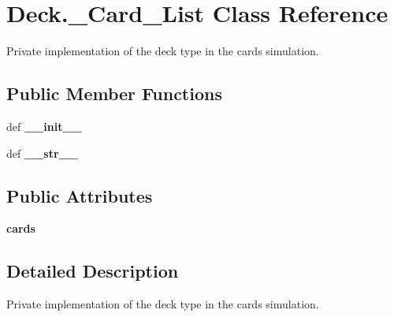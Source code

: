 \hypertarget{classDeck_1_1__Card__List}{\section{Deck.\-\_\-\-Card\-\_\-\-List Class Reference}
\label{classDeck_1_1__Card__List}
}


Private implementation of the deck type in the cards simulation.  


\subsection*{Public Member Functions}
\begin{DoxyCompactItemize}
\item 
\hypertarget{classDeck_1_1__Card__List_ae6fadbe948a40577d0ced48281f3df08}{def {\bfseries \-\_\-\-\_\-init\-\_\-\-\_\-}}\label{classDeck_1_1__Card__List_ae6fadbe948a40577d0ced48281f3df08}

\item 
\hypertarget{classDeck_1_1__Card__List_a949bf52f013fbe75fd2830e9d83476d8}{def {\bfseries \-\_\-\-\_\-str\-\_\-\-\_\-}}\label{classDeck_1_1__Card__List_a949bf52f013fbe75fd2830e9d83476d8}

\end{DoxyCompactItemize}
\subsection*{Public Attributes}
\begin{DoxyCompactItemize}
\item 
\hypertarget{classDeck_1_1__Card__List_a5f1d2ad3cf850eb0440777047d0872ff}{{\bfseries cards}}\label{classDeck_1_1__Card__List_a5f1d2ad3cf850eb0440777047d0872ff}

\end{DoxyCompactItemize}


\subsection{Detailed Description}
Private implementation of the deck type in the cards simulation. 